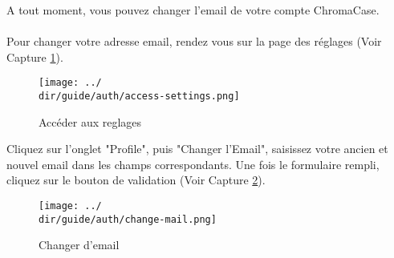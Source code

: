 A tout moment, vous pouvez changer l’email de votre compte ChromaCase.
\\\\
Pour changer votre adresse email, rendez vous sur la page des réglages (Voir Capture \ref{fig:access-settings-mail}).

\begin{figure}[H]
	\texttt{[image: ../\\dir/guide/auth/access-settings.png]}
	\caption{Accéder aux reglages}
	\label{fig:access-settings-mail}
\end{figure}

Cliquez sur l'onglet "Profile", puis "Changer l'Email", saisissez votre ancien et nouvel email dans les champs correspondants. Une fois le formulaire rempli, cliquez sur le bouton de validation (Voir Capture \ref{fig:change-mail}).

\begin{figure}[H]
	\texttt{[image: ../\\dir/guide/auth/change-mail.png]}
	\caption{Changer d'email}
	\label{fig:change-mail}
\end{figure}